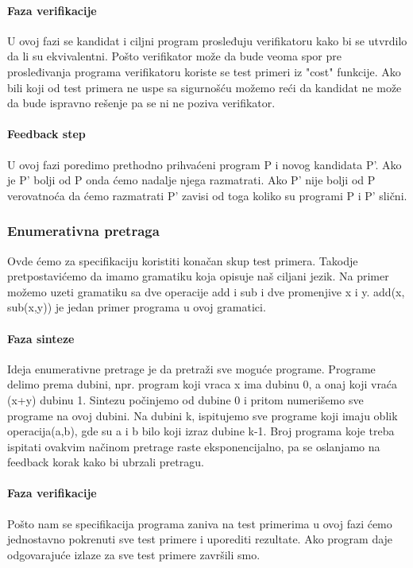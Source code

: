 \paragraph{Faza verifikacije}

U ovoj fazi se kandidat i ciljni program prosleđuju verifikatoru kako bi se utvrdilo da li su ekvivalentni. Pošto verifikator može da bude veoma spor pre prosleđivanja programa verifikatoru koriste se test primeri iz "cost" funkcije. Ako bili koji od test primera ne uspe sa sigurnošću možemo reći da kandidat ne može da bude ispravno rešenje pa se ni ne poziva verifikator.

\paragraph{Feedback step}

U ovoj fazi poredimo prethodno prihvaćeni program P i novog kandidata P'. Ako je P' bolji od P onda ćemo nadalje njega razmatrati. Ako P' nije bolji od P verovatnoća da ćemo razmatrati P' zavisi od toga koliko su programi P i P' slični.

\subsubsection{Enumerativna pretraga}
\label{subsec:enumerativnaPretraga}

Ovde ćemo za specifikaciju koristiti konačan skup test primera. Takodje pretpostavićemo da imamo gramatiku koja opisuje naš ciljani jezik. Na primer možemo uzeti gramatiku sa dve operacije add i sub i dve promenjive x i y. add(x, sub(x,y)) je jedan primer programa u ovoj gramatici.

\paragraph{Faza sinteze}

Ideja enumerativne pretrage je da pretraži sve moguće programe. Programe delimo prema dubini, npr. program koji vraca x ima dubinu 0, a onaj koji vraća (x+y) dubinu 1.
Sintezu počinjemo od dubine 0 i pritom numerišemo sve programe na ovoj dubini. Na dubini k, ispitujemo sve programe koji imaju oblik operacija(a,b), gde su a i b bilo koji izraz dubine k-1. Broj programa koje treba ispitati ovakvim načinom pretrage raste eksponencijalno, pa se oslanjamo na feedback korak kako bi ubrzali pretragu.

\paragraph{Faza verifikacije}
Pošto nam se specifikacija programa zaniva na test primerima u ovoj fazi ćemo jednostavno pokrenuti sve test primere i uporediti rezultate. Ako program daje odgovarajuće izlaze za sve test primere završili smo.

